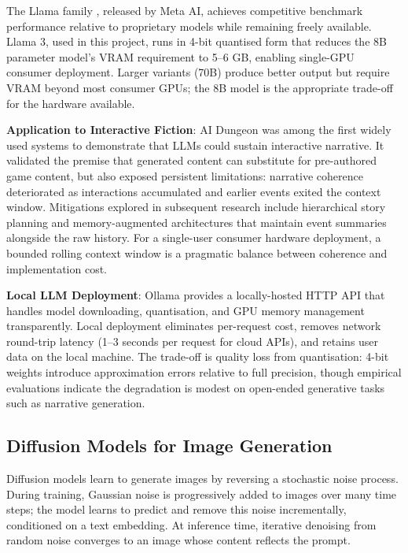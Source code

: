 \documentclass[12pt,a4paper]{article}
\begin{document}
The Llama family \cite{touvron2023llama}, released by Meta AI, achieves competitive benchmark performance relative to proprietary models while remaining freely available. Llama 3, used in this project, runs in 4-bit quantised form that reduces the 8B parameter model's VRAM requirement to 5--6 GB, enabling single-GPU consumer deployment. Larger variants (70B) produce better output but require VRAM beyond most consumer GPUs; the 8B model is the appropriate trade-off for the hardware available.

\textbf{Application to Interactive Fiction}: AI Dungeon \cite{walton2019aidungeon} was among the first widely used systems to demonstrate that LLMs could sustain interactive narrative. It validated the premise that generated content can substitute for pre-authored game content, but also exposed persistent limitations: narrative coherence deteriorated as interactions accumulated and earlier events exited the context window. Mitigations explored in subsequent research include hierarchical story planning and memory-augmented architectures that maintain event summaries alongside the raw history. For a single-user consumer hardware deployment, a bounded rolling context window is a pragmatic balance between coherence and implementation cost.

\textbf{Local LLM Deployment}: Ollama \cite{ollama2024} provides a locally-hosted HTTP API that handles model downloading, quantisation, and GPU memory management transparently. Local deployment eliminates per-request cost, removes network round-trip latency (1--3 seconds per request for cloud APIs), and retains user data on the local machine. The trade-off is quality loss from quantisation: 4-bit weights introduce approximation errors relative to full precision, though empirical evaluations indicate the degradation is modest on open-ended generative tasks such as narrative generation.

    \subsection{Diffusion Models for Image Generation}

Diffusion models learn to generate images by reversing a stochastic noise process. During training, Gaussian noise is progressively added to images over many time steps; the model learns to predict and remove this noise incrementally, conditioned on a text embedding. At inference time, iterative denoising from random noise converges to an image whose content reflects the prompt.
\end{document}
